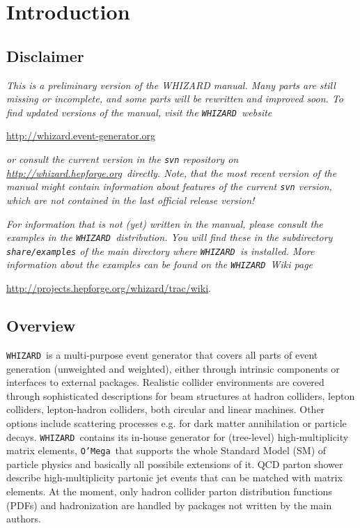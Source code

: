 \documentclass[12pt]{book}
\newcommand{\whizardpage}{\url{http://whizard.event-generator.org}}
\newcommand{\hepforgepage}{\url{http://whizard.hepforge.org}}
\newcommand{\whizardwiki}{\url{http://projects.hepforge.org/whizard/trac/wiki}}
\newcommand{\whizard}{\texttt{WHIZARD}}
\newcommand{\oMega}{\texttt{O'Mega}}
\begin{document}
\tableofcontents

\newpage
\chapter{Introduction}

\section{Disclaimer}

\emph{This is a preliminary version of the WHIZARD manual.  Many parts
  are still missing or incomplete, and some parts will be rewritten and
  improved soon.  To find updated versions of the manual,
  visit the \whizard\ website}
\begin{center}
  \whizardpage
\end{center}
\emph{or consult the current version in the \texttt{svn} repository
  on \hepforgepage\ directly. Note, that the most recent version of
  the manual might contain information about features of the
  current \texttt{svn} version, which are not contained in the last
  official release version!}  

\emph{For information that is not (yet) written in the manual, please
consult the examples in the \whizard\ distribution.  You will find these in
the subdirectory \texttt{share/examples} of the main directory where
\whizard\ is installed. More information about the examples can be
found on the \whizard\ Wiki page}
\begin{center}
  \whizardwiki . 
\end{center}


\clearpage
\section{Overview}

\whizard\ is a multi-purpose event generator that covers all parts of
event generation (unweighted and weighted), either through intrinsic
components or interfaces to external packages. Realistic collider
environments are covered through sophisticated descriptions for beam
structures at hadron colliders, lepton colliders, lepton-hadron
colliders, both circular and linear machines. Other options include
scattering processes e.g. for dark matter annihilation or particle
decays. \whizard\ contains its in-house generator for (tree-level)
high-multiplicity matrix elements, \oMega\, that supports the whole
Standard Model (SM) of particle physics and basically all possibile
extensions of it. QCD parton shower describe high-multiplicity
partonic jet events that can be matched with matrix elements. At the
moment, only hadron collider parton distribution functions (PDFs) and
hadronization are handled by packages not written by the main
authors. 
\end{document}
